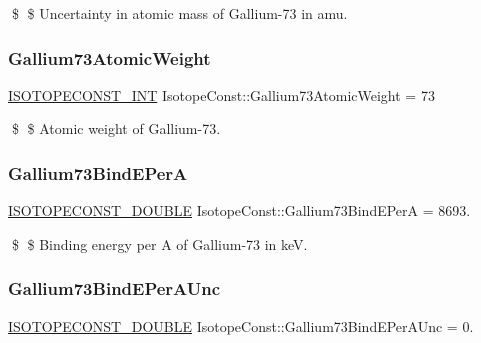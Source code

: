 \$ \$ Uncertainty in atomic mass of Gallium-\/73 in amu. \mbox{\label{group___isotope_const-_gallium-_ga73_gaae50458d0f11451b0e59b26bcc07fb93}} 
\subsubsection{\texorpdfstring{Gallium73\+Atomic\+Weight}{Gallium73AtomicWeight}}
{\footnotesize\ttfamily \mbox{\hyperlink{group___isotope_const-_macros_ga5f18360b3e99483a35c32d789e62621c}{I\+S\+O\+T\+O\+P\+E\+C\+O\+N\+S\+T\+\_\+\+I\+NT}} Isotope\+Const\+::\+Gallium73\+Atomic\+Weight = 73}

\$ \$ Atomic weight of Gallium-\/73. \mbox{\label{group___isotope_const-_gallium-_ga73_ga1bc485cec8f55faa101a0b7a524bb502}} 
\subsubsection{\texorpdfstring{Gallium73\+Bind\+E\+PerA}{Gallium73BindEPerA}}
{\footnotesize\ttfamily \mbox{\hyperlink{group___isotope_const-_macros_ga8f45a7272ce02c0b4c65c44636ed719a}{I\+S\+O\+T\+O\+P\+E\+C\+O\+N\+S\+T\+\_\+\+D\+O\+U\+B\+LE}} Isotope\+Const\+::\+Gallium73\+Bind\+E\+PerA = 8693.}

\$ \$ Binding energy per A of Gallium-\/73 in keV. \mbox{\label{group___isotope_const-_gallium-_ga73_ga24dcf17f70446a004eb6e7bd44c8a81e}} 
\subsubsection{\texorpdfstring{Gallium73\+Bind\+E\+Per\+A\+Unc}{Gallium73BindEPerAUnc}}
{\footnotesize\ttfamily \mbox{\hyperlink{group___isotope_const-_macros_ga8f45a7272ce02c0b4c65c44636ed719a}{I\+S\+O\+T\+O\+P\+E\+C\+O\+N\+S\+T\+\_\+\+D\+O\+U\+B\+LE}} Isotope\+Const\+::\+Gallium73\+Bind\+E\+Per\+A\+Unc = 0.}


